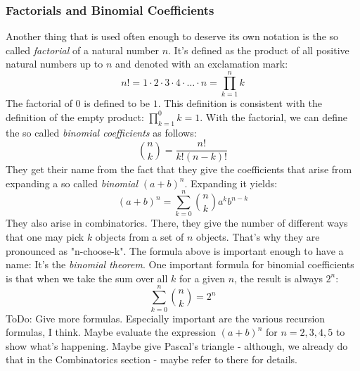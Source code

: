 \subsubsection{Factorials and Binomial Coefficients}
\label{Sec:FactorialsAndBinomCoeffs}
Another thing that is used often enough to deserve its own notation is the so called \emph{factorial} of a natural number $n$. It's defined as the product of all positive natural numbers up to $n$ and denoted with an exclamation mark:
\label{Def:Factorial}
\begin{equation}
 n! = 1 \cdot 2 \cdot 3 \cdot 4 \cdot \ldots \cdot n = \prod_{k=1}^{n} k
\end{equation}
The factorial of $0$ is defined to be $1$. This definition is consistent with the definition of the empty product: $\prod_{k=1}^{0} k = 1$. With the factorial, we can define the so called \emph{binomial coefficients} as follows:
\begin{equation}
\label{Eq:BinomialCoeffs}
 \binom{n}{k} = \frac{n!}{k! (n-k)!}
\end{equation}
They get their name from the fact that they give the coefficients that arise from expanding a so called \emph{binomial} $(a+b)^n$. Expanding it yields:
\begin{equation}
\label{Eq:BinomialTheorem}
(a+b)^n = \sum_{k=0}^{n} \binom{n}{k} a^k b^{n-k}
\end{equation}
They also arise in combinatorics. There, they give the number of different ways that one may pick $k$ objects from a set of $n$ objects. That's why they are pronounced as "n-choose-k". The formula above is important enough to have a name: It's the \emph{binomial theorem}. One important formula for binomial coefficients is that when we take the sum over all $k$ for a given $n$, the result is always $2^n$:
\begin{equation}
\label{Eq:BinomialCoeffsSum}
\sum_{k=0}^n \binom{n}{k} = 2^n
\end{equation}
ToDo: Give more formulas. Especially important are the various recursion formulas, I think. Maybe evaluate the expression $(a+b)^n$ for $n=2,3,4,5$ to show what's happening. Maybe give Pascal's triangle - although, we already do that in the Combinatorics section - maybe refer to there for details.




